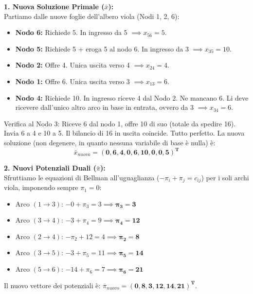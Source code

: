 \documentclass[12pt, a4paper]{article}
\begin{document}
	\textbf{1. Nuova Soluzione Primale ($\bar{x}$):}\\
	Partiamo dalle nuove foglie dell'albero viola (Nodi 1, 2, 6):
	\begin{itemize}
		\item \textbf{Nodo 6:} Richiede 5. In ingresso da 5 $\implies x_{56} = 5$.
		\item \textbf{Nodo 5:} Richiede 5 + eroga 5 al nodo 6. In ingresso da 3 $\implies x_{35} = 10$.
		\item \textbf{Nodo 2:} Offre 4. Unica uscita verso 4 $\implies x_{24} = 4$.
		\item \textbf{Nodo 1:} Offre 6. Unica uscita verso 3 $\implies x_{13} = 6$.
		\item \textbf{Nodo 4:} Richiede 10. In ingresso riceve 4 dal Nodo 2. Ne mancano 6. Li deve ricevere dall'unico altro arco in base in entrata, ovvero da 3 $\implies x_{34} = 6$.
	\end{itemize}
	Verifica al Nodo 3: Riceve 6 dal nodo 1, offre 10 di suo (totale da spedire 16). Invia 6 a 4 e 10 a 5. Il bilancio di 16 in uscita coincide. Tutto perfetto.
	La nuova soluzione (non degenere, in quanto nessuna variabile di base è nulla) è:
	\[ \bar{x}_{nuova} = \mathbf{(0, 6, 4, 0, 6, 10, 0, 0, 5)^T} \]
	
	\textbf{2. Nuovi Potenziali Duali ($\bar{\pi}$):}\\
	Sfruttiamo le equazioni di Bellman all'uguaglianza ($-\pi_i + \pi_j = c_{ij}$) per i soli archi viola, imponendo sempre $\pi_1 = 0$:
	\begin{itemize}
		\item Arco $(1\to3)$: $-0 + \pi_3 = 3 \implies \mathbf{\pi_3 = 3}$
		\item Arco $(3\to4)$: $-3 + \pi_4 = 9 \implies \mathbf{\pi_4 = 12}$
		\item Arco $(2\to4)$: $-\pi_2 + 12 = 4 \implies \mathbf{\pi_2 = 8}$
		\item Arco $(3\to5)$: $-3 + \pi_5 = 11 \implies \mathbf{\pi_5 = 14}$
		\item Arco $(5\to6)$: $-14 + \pi_6 = 7 \implies \mathbf{\pi_6 = 21}$
	\end{itemize}
	Il nuovo vettore dei potenziali è: $\bar{\pi}_{nuovo} = \mathbf{(0, 8, 3, 12, 14, 21)^T}$.
	
\end{document}
